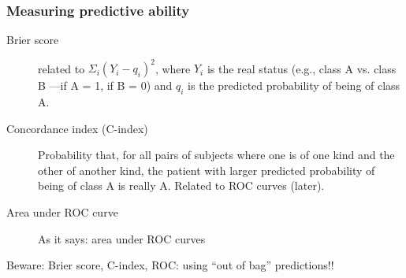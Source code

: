 \begin{frame}
\frametitle{Measuring predictive ability}

\begin{description}

\item[Brier score] related to $\Sigma_i (Y_i - q_i)^2$, where
$Y_i$ is the real status (e.g., class A vs. class B ---if A = 1, if
B = 0)  and $q_i$ is the predicted probability of being of class A.


\item[Concordance index (C-index)] Probability that, for all pairs of subjects
  where one is of one kind and the other of another kind, the patient with
  larger predicted probability of being of class A is really A. Related to
  ROC curves (later).

\item[Area under ROC curve] As it says: area under ROC curves 

\end{description}

Beware: Brier score, C-index, ROC: using ``out of bag'' predictions!!

\end{frame}



 










